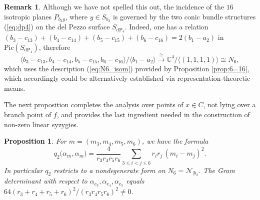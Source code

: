 \documentclass[11pt]{amsart}
\newtheorem{proposition}[theorem]{Proposition}
\theoremstyle{definition}
\newtheorem{remark}[theorem]{Remark}
\def\cN{\mathcal{N}}
\begin{document}
\vskip 4pt

\begin{remark}\label{rmk:d5}
Although we have not spelled this out, the incidence of the $16$ isotropic planes $P_{b_2 y}$, where $y\in S_{b_2}$ is governed by the two conic bundle structures (\ref{eq;dp4}) on the del Pezzo surface $S_{\mathrm{dP}_4}$. Indeed, one has a relation $(b_3-c_{13})+(b_4-c_{14})+(b_5-c_{15})+(b_6-c_{16})=2(b_1-a_2)$ in $\mbox{Pic}(S_{\mathrm{dP}_4})$, therefore 
$$\bigl\langle b_3-c_{13}, b_4-c_{14}, b_5-c_{15}, b_6-c_{16}\bigr\rangle/\bigl\langle b_1-a_2\bigr\rangle \stackrel{\cong}\longrightarrow \mathbb C^4/\bigl\langle (1,1,1,1)\bigr\rangle \cong N_6,$$
which uses the description (\ref{eq;N6_isom}) provided by Proposition \ref{prop:6=16}, which accordingly could be alternatively established via representation-theoretic means.
\end{remark}

The next proposition completes the analysis over points of $x\in C$, not lying over a branch point of $f$, and provides the last ingredient needed in the construction of non-zero linear syzygies.

\begin{proposition}\label{prop:q2formula}
For $m=(m_3, m_4, m_5, m_6)$, we have the formula
$$
q_2\bigl(\alpha_m, \alpha_m\bigr)=\frac{4}{r_3r_4r_5r_6}\sum_{3\le i<j\le 6}r_ir_j\,(m_i-m_j)^2.
$$
In particular $q_2$ restricts to a nondegenerate form on $N_6=\cN_{|b_2}$. The Gram determinant with respect to $\alpha_{e_3},\alpha_{e_4},\alpha_{e_5}$ equals $64(r_3+r_4+r_5+r_6)^2/(r_3r_4r_5r_6)^2\neq 0$.
\end{proposition}
\end{document}
